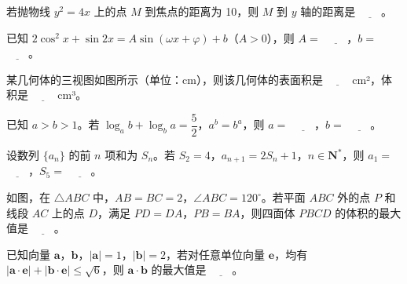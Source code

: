 \begin{question}
若抛物线 \(y^{2}=4x\) 上的点 \(M\) 到焦点的距离为 10，则 \(M\) 到 \(y\) 轴的距离是 \(\underline{\qquad}\)。

\end{question}
\begin{question}
已知 \(2\cos^{2}x+\sin 2x=A\sin(\omega x+\varphi)+b\)（\(A>0\)），则 \(A=\) \(\underline{\qquad}\)，\(b=\) \(\underline{\qquad}\)。

\Needspace{0.4\textheight}
\end{question}
\begin{question}
某几何体的三视图如图所示（单位：cm），则该几何体的表面积是 \(\underline{\qquad}\) cm²，体积是 \(\underline{\qquad}\) cm³。
\nopagebreak[4]
\begin{center}\end{center}
\nopagebreak[4]
\end{question}
\begin{question}
已知 \(a>b>1\)。若 \(\log_{a}b+\log_{b}a=\dfrac{5}{2}\)，\(a^{b}=b^{a}\)，则 \(a=\) \(\underline{\qquad}\)，\(b=\) \(\underline{\qquad}\)。

\end{question}
\begin{question}
设数列 \(\{a_{n}\}\) 的前 \(n\) 项和为 \(S_{n}\)。若 \(S_{2}=4\)，\(a_{n+1}=2S_{n}+1\)，\(n\in\mathbf{N}^{*}\)，则 \(a_{1}=\) \(\underline{\qquad}\)，\(S_{5}=\) \(\underline{\qquad}\)。

\Needspace{0.4\textheight}
\end{question}
\begin{question}
如图，在 \(\triangle ABC\) 中，\(AB=BC=2\)，\(\angle ABC=120^{\circ}\)。若平面 \(ABC\) 外的点 \(P\) 和线段 \(AC\) 上的点 \(D\)，满足 \(PD=DA\)，\(PB=BA\)，则四面体 \(PBCD\) 的体积的最大值是 \(\underline{\qquad}\)。
\nopagebreak[4]
\begin{center}\end{center}
\nopagebreak[4]
\end{question}
\begin{question}
已知向量 \(\mathbf{a}\)，\(\mathbf{b}\)，\(|\mathbf{a}|=1\)，\(|\mathbf{b}|=2\)，若对任意单位向量 \(\mathbf{e}\)，均有 \(|\mathbf{a}\cdot\mathbf{e}|+|\mathbf{b}\cdot\mathbf{e}|\leqslant\sqrt{6}\)，则 \(\mathbf{a}\cdot\mathbf{b}\) 的最大值是 \(\underline{\qquad}\)。

\end{question}

